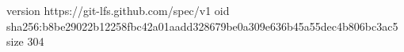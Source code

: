 version https://git-lfs.github.com/spec/v1
oid sha256:b8be29022b12258fbc42a01aadd328679be0a309e636b45a55dec4b806bc3ac5
size 304
